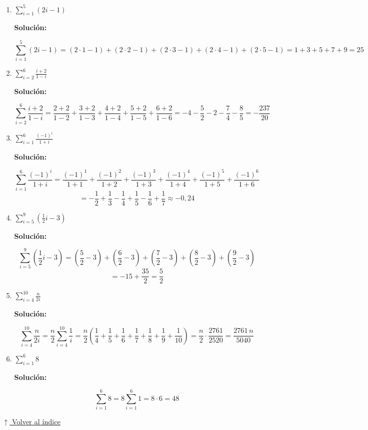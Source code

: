 \documentclass[12pt]{article}
\newcommand{\solucion}{%
    \vspace{0.8em}%
    \textbf{Solución:}%
}
\newcommand{\volverindice}{%
    \vspace{1em}%
    \begin{flushright}%
        \hyperlink{indice}{\small $\uparrow$ Volver al índice}%
    \end{flushright}%
}
\begin{document}
\begin{enumerate}[label=\alph*.-]
    \item $\displaystyle\sum_{i=1}^{5}(2i-1)$

    \solucion
    \[
    \sum_{i=1}^{5}(2i-1) = (2\cdot1-1)+(2\cdot2-1)+(2\cdot3-1)+(2\cdot4-1)+(2\cdot5-1)
    = 1+3+5+7+9 = 25
    \]

    \item $\displaystyle\sum_{i=2}^{6}\frac{i+2}{1-i}$

    \solucion
    \[
    \sum_{i=2}^{6}\frac{i+2}{1-i}
    = \frac{2+2}{1-2}+\frac{3+2}{1-3}+\frac{4+2}{1-4}+\frac{5+2}{1-5}+\frac{6+2}{1-6}
    = -4-\frac{5}{2}-2-\frac{7}{4}-\frac{8}{5} = -\frac{237}{20}
    \]

    \item $\displaystyle\sum_{i=1}^{6}\frac{(-1)^{i}}{1+i}$

    \solucion
    \[
    \sum_{i=1}^{6}\frac{(-1)^{i}}{1+i}
    = \frac{(-1)^1}{1+1}+\frac{(-1)^2}{1+2}+\frac{(-1)^3}{1+3}+\frac{(-1)^4}{1+4}+\frac{(-1)^5}{1+5}+\frac{(-1)^6}{1+6}
    \]
    \[
    = -\frac{1}{2}+\frac{1}{3}-\frac{1}{4}+\frac{1}{5}-\frac{1}{6}+\frac{1}{7} \approx -0{,}24
    \]

    \item $\displaystyle\sum_{i=5}^{9}\left(\frac{1}{2}i-3\right)$

    \solucion
    \[
    \sum_{i=5}^{9}\left(\frac{1}{2}i-3\right)
    = \left(\frac{5}{2}-3\right)+\left(\frac{6}{2}-3\right)+\left(\frac{7}{2}-3\right)+\left(\frac{8}{2}-3\right)+\left(\frac{9}{2}-3\right)
    \]
    \[
    = -15 + \frac{35}{2} = \frac{5}{2}
    \]

    \newpage
    \item $\displaystyle\sum_{i=4}^{10}\frac{n}{2i}$

    \solucion
    \[
    \sum_{i=4}^{10}\frac{n}{2i}
    = \frac{n}{2}\sum_{i=4}^{10}\frac{1}{i}
    = \frac{n}{2}\left(\frac{1}{4}+\frac{1}{5}+\frac{1}{6}+\frac{1}{7}+\frac{1}{8}+\frac{1}{9}+\frac{1}{10}\right)
    = \frac{n}{2}\cdot\frac{2761}{2520}
    = \frac{2761\,n}{5040}
    \]

    \item $\displaystyle\sum_{i=1}^{6}8$

    \solucion
    \[
    \sum_{i=1}^{6}8 = 8\sum_{i=1}^{6}1 = 8\cdot6 = 48
    \]

\end{enumerate}

\volverindice
\newpage

\end{document}
